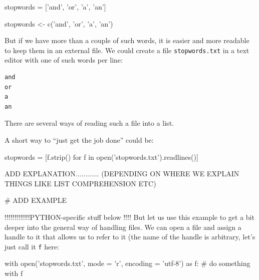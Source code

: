 \begin{examplepy}
stopwords = ['and', 'or', 'a', 'an']
\end{examplepy}

\begin{exampler}
stopwords <- c('and', 'or', 'a', 'an')
\end{exampler}

But if we have more than a couple of such words, it is easier and more readable to keep them in an external file. We could create a file \texttt{stopwords.txt} in a text editor with one of such words per line:

\begin{lstlisting}
and
or
a
an
\end{lstlisting}

There are several ways of reading such a file into a list.

A short way to ``just get the job done'' could be:

\begin{examplepy}
stopwords =  [f.strip() for f in open('stopwords.txt').readlines()]
\end{examplepy}

ADD EXPLANATION............ (DEPENDING ON WHERE WE EXPLAIN THINGS LIKE LIST COMPREHENSION ETC)

\begin{exampler}
# ADD EXAMPLE
\end{exampler}





!!!!!!!!!!!!!PYTHON-specific stuff below !!!!
But let us use this example to get a bit deeper into the general way of handling files.
We can open a file and assign a handle to it that allows us to refer to it (the name of the handle is arbitrary, let's just call it \texttt{f} here:

\begin{examplepy}
with open('stopwords.txt', mode = 'r', encoding = 'utf-8') as f:
    # do something with f 
\end{examplepy}

